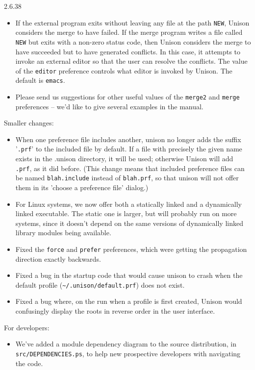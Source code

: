\begin{changesfromversion}{2.6.38}
\begin{itemize}
\begin{itemize}
  \item If the external program exits without leaving any file at the
  path \verb|NEW|,
      Unison considers the merge to have failed.  If the merge program writes
      a file called \verb|NEW| but exits with a non-zero status code,
      then Unison
      considers the merge to have succeeded but to have generated conflicts.
      In this case, it attempts to invoke an external editor so that the
      user can resolve the conflicts.  The value of the \verb|editor|
      preference controls what editor is invoked by Unison.  The default
      is \verb|emacs|.

  \item Please send us suggestions for other useful values of the
       \verb|merge2| and \verb|merge| preferences -- we'd like to give several
       examples in the manual.
\end{itemize}
\end{itemize}

\item Smaller changes:
\begin{itemize}
\item When one preference file includes another, unison no longer adds the
  suffix '\verb|.prf|' to the included file by default.  If a file with
  precisely the given name exists in the .unison directory, it will be used;
  otherwise Unison will
  add \verb|.prf|, as it did before.  (This change means that included
  preference files can be named \verb|blah.include| instead of
  \verb|blah.prf|, so that unison will not offer them in its 'choose
  a preference file' dialog.)
\item For Linux systems, we now offer both a statically linked and a dynamically
  linked executable.  The static one is larger, but will probably run on more
  systems, since it doesn't depend on the same versions of dynamically
  linked library modules being available.
\item Fixed the \verb|force| and \verb|prefer| preferences, which were
  getting the propagation direction exactly backwards.
\item Fixed a bug in the startup code that would cause unison to crash
  when the default profile (\verb|~/.unison/default.prf|) does not exist.
\item Fixed a bug where, on the run when a profile is first created,
  Unison would confusingly display the roots in reverse order in the user
  interface.
\end{itemize}

\item For developers:
\begin{itemize}
\item We've added a module dependency diagram to the source distribution, in
   \verb|src/DEPENDENCIES.ps|, to help new prospective developers with
   navigating the code.
\end{itemize}
\end{changesfromversion}

